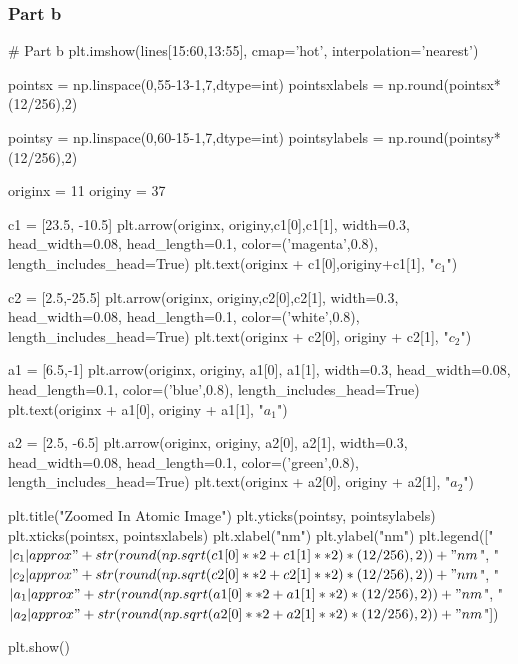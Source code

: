 \subsubsection*{Part b}
\begin{python}
# Part b
plt.imshow(lines[15:60,13:55], cmap='hot', interpolation='nearest')

pointsx = np.linspace(0,55-13-1,7,dtype=int)
pointsxlabels = np.round(pointsx*(12/256),2)

pointsy = np.linspace(0,60-15-1,7,dtype=int)
pointsylabels = np.round(pointsy*(12/256),2)

originx = 11
originy = 37

c1 = [23.5, -10.5]
plt.arrow(originx, originy,c1[0],c1[1], width=0.3,
    head_width=0.08,
    head_length=0.1,
    color=('magenta',0.8),
    length_includes_head=True)
plt.text(originx + c1[0],originy+c1[1], "$c_1$")

c2 = [2.5,-25.5]
plt.arrow(originx, originy,c2[0],c2[1], width=0.3,
    head_width=0.08,
    head_length=0.1,
    color=('white',0.8),
    length_includes_head=True)
plt.text(originx + c2[0], originy + c2[1], "$c_2$")

a1 = [6.5,-1]
plt.arrow(originx, originy, a1[0], a1[1], width=0.3,
    head_width=0.08,
    head_length=0.1,
    color=('blue',0.8),
    length_includes_head=True)
plt.text(originx + a1[0], originy + a1[1], "$a_1$")

a2 = [2.5, -6.5]
plt.arrow(originx, originy, a2[0], a2[1], width=0.3,
    head_width=0.08,
    head_length=0.1,
    color=('green',0.8),
    length_includes_head=True)
plt.text(originx + a2[0], originy + a2[1], "$a_2$")

plt.title("Zoomed In Atomic Image")
plt.yticks(pointsy, pointsylabels)
plt.xticks(pointsx, pointsxlabels)
plt.xlabel("nm")
plt.ylabel("nm")
plt.legend(["$|c_1| \\approx "+str(round(np.sqrt(c1[0]**2+c1[1]**2)*(12/256),2))+"nm$",
            "$|c_2| \\approx "+str(round(np.sqrt(c2[0]**2+c2[1]**2)*(12/256),2))+"nm$",
            "$|a_1| \\approx "+str(round(np.sqrt(a1[0]**2+a1[1]**2)*(12/256),2))+"nm$",
            "$|a_2| \\approx "+str(round(np.sqrt(a2[0]**2+a2[1]**2)*(12/256),2))+"nm$"])

plt.show()
\end{python}
